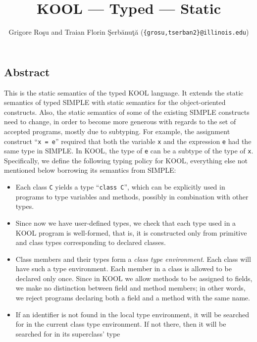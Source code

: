 \setlength{\parindent}{1em}
\title{KOOL --- Typed --- Static}
\author{Grigore Ro\c{s}u and 
        Traian Florin \c{S}erb\u{a}nu\c{t}\u{a}
        (\texttt{\{grosu,tserban2\}@illinois.edu})}

\maketitle

\begin{latexComment}
\section{Abstract}
This is the \K static semantics of the typed KOOL language.
It extends the static semantics of typed SIMPLE with static semantics
for the object-oriented constructs.  Also, the static semantics of
some of the existing SIMPLE constructs need to change, in order to
become more generous with regards to the set of accepted programs,
mostly due to subtyping.  For example, the assignment construct
``\texttt{x = e}'' required that both the variable \texttt{x} and the
expression \texttt{e} had the same type in SIMPLE\@.  In KOOL, the type
of \texttt{e} can be a subtype of the type of \texttt{x}.
Specifically, we define the following typing policy for KOOL,
everything else not mentioned below borrowing its semantics from
SIMPLE:
\begin{itemize}
\item Each class \texttt{C} yields a type ``\texttt{class C}'', which
can be explicitly used in programs to type variables and methods,
possibly in combination with other types.
\item Since now we have user-defined types, we check that each type
used in a KOOL program is well-formed, that is, it is constructed only
from primitive and class types corresponding to declared classes.
\item Class members and their types form a {\em class type
environment}.  Each class will have such a type environment.
Each member in a class is allowed to be declared only once.  Since in
KOOL we allow methods to be assigned to fields, we make no distinction
between field and method members; in other words, we reject programs
declaring both a field and a method with the same name.
\item If an identifier is not found in the local type environment, it
will be searched for in the current class type environment.  If not
there, then it will be searched for in its superclass' type

\end{itemize}
\end{latexComment}
